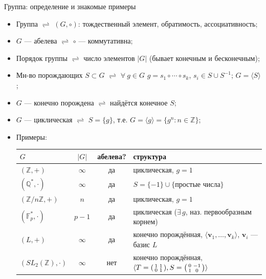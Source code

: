 \documentclass[serif, aspectratio=169]{beamer}
\begin{document}
\begin{frame}{Группа: определение и знакомые примеры}
    \begin{itemize}
        \item Группа $\rightleftharpoons$ $(G,\circ)$: тождественный элемент, обратимость, ассоциативность;
        \item $G$ --- абелева $\rightleftharpoons$ $\circ$ --- коммутативна;
        \item Порядок группы $\rightleftharpoons$ число элементов $|G|$ (бывает конечным и бесконечным);
        \item Мн-во порождающих $S\subset G$ $\rightleftharpoons$ $\forall\ g\in G$ $g=s_1\circ\cdots\circ s_k$, $s_i\in S\cup S^{-1}$; $G=\langle S \rangle$; 
        \item $G$ --- конечно порождена $\rightleftharpoons$ найдётся конечное $S$;
        \item $G$ --- циклическая $\rightleftharpoons$ $S=\{g\}$, т.е. $G=\langle g\rangle=\{g^n:n\in\mathbb{Z}\}$;
        \item Примеры:
        \begin{center}
            \small
        \begin{tabular}{lccl}
            \toprule
            $G$ & $|G|$ & абелева? & структура \\
            \midrule
            $(\mathbb{Z},+)$ & $\infty$ & да & циклическая, $g=1$ \\
            $(\mathbb{Q}^*,\cdot)$ & $\infty$ & да & $S=\{-1\}\cup\{\text{простые числа}\}$ \\
            $(\mathbb{Z}/n\mathbb{Z},+)$ & $n$ & да & циклическая, $g=1$ \\
            $(\mathbb{F}_p^*,\cdot)$ & $p-1$ & да & циклическая ($\exists\,g$, наз. первообразным корнем) \\
            $(L,+)$ & $\infty$ & да & конечно порождённая, $\langle\mathbf{v}_1,\dots,\mathbf{v}_k\rangle$, $\mathbf{v}_i$ --- базис $L$ \\
            $(SL_2(\mathbb{Z}),\cdot)$ & $\infty$ & нет & конечно порождённая, $\langle T=\begin{psmallmatrix}1&1\\0&1\end{psmallmatrix},S=\begin{psmallmatrix}0&-1\\1&0\end{psmallmatrix} \rangle$ \\
            \bottomrule
        \end{tabular}
        \end{center}
    \end{itemize}
    \note{
        \begin{itemize}
            \item ---
        \end{itemize}
    }
\end{frame}
\end{document}
